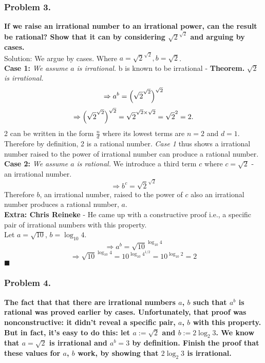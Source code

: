 \documentclass{article}
\begin{document}
\subsubsection{Problem 3.}
\textbf{If we raise an irrational number to an irrational power, can the result be rational? Show that it can by considering $\sqrt{2}^{\sqrt{2}}$ and arguing by cases.}
\\[5pt]
Solution: We argue by cases. Where \(a = \sqrt{2}^{\sqrt{2}}, b = \sqrt{2}\).
\\[5pt]
\textbf{Case 1:} \textit{We assume $a$ is irrational.}
b is known to be irrational - \textbf{Theorem.} \textit{$\sqrt{2}$ is irrational.} 
\[\Rightarrow a^{b} = \Bigl(\sqrt{2}^{\sqrt{2}}\Bigr)^{\sqrt{2}}\]
\[\Rightarrow \Bigl(\sqrt{2}^{\sqrt{2}}\Bigr)^{\sqrt{2}} = \sqrt{2}^{\sqrt{2} \times \sqrt{2}} = \sqrt{2}^{2} = 2.\]
2 can be written in the form $\frac{n}{d}$ where its lowest terms are $n = 2$ and $d = 1$. Therefore by definition, 2 is a rational number. \textit{Case 1} thus shows a irrational number raised to the power of irrational number can produce a rational number.
\\[5pt]
\noindent
\textbf{Case 2:} \textit{We assume $a$ is rational.} We introduce a third term $c$ where $c = \sqrt{2}$ - an irrational number. 
\[\Rightarrow b^{c} = \sqrt{2}^{\sqrt{2}}\]
Therefore $b$, an irrational number, raised to the power of $c$ also an irrational number produces a rational number, $a$.
\\[5pt]
\noindent
\textbf{Extra: Chris Reineke} - He came up with a constructive proof i.e., a specific pair of irrational numbers with this property. 
\\[5pt]
\noindent
Let $a = \sqrt{10}$,  $b = \log_{10}4$.
\[\Rightarrow a^{b} = \sqrt{10}^{\log_{10}4}\]
\[\Rightarrow \sqrt{10}^{\log_{10}4} = 10^{\log_{10}4^{1/2}} = 10^{\log_{10}2} = 2\]
$ \blacksquare $

\subsubsection{Problem 4.}
\textbf{The fact that that there are irrational numbers $a$, $b$ such that $a^{b}$ is rational was proved earlier by cases. Unfortunately, that proof was nonconstructive: it didn't reveal a specific pair, $a$, $b$ with this property. But in fact, it's easy to do this: let $a := \sqrt{2}$ and $b := 2\log_{2}3$. We know that $a = \sqrt{2}$ is irrational and $a^{b} = 3$ by definition. Finish the proof that these values for $a$, $b$ work, by showing that $2\log_{2}3$ is irrational.}
\end{document}
